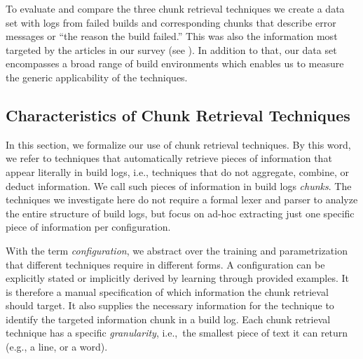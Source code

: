 To evaluate and compare the three chunk retrieval techniques
we create a data set with logs from failed builds and corresponding
chunks that describe error messages or
``the reason the build failed.''
This was also the information
most targeted by the articles in our survey (see ).
In addition to that, our data set encompasses a broad range of
build environments which enables us to measure the generic
applicability of the techniques.


\subsection{Characteristics of Chunk Retrieval Techniques}

\label{sec:crt-characteristics}
In this section, we formalize our use of chunk retrieval techniques. By this word, we refer to techniques that automatically
retrieve pieces of information that appear literally in build
logs, i.e., techniques that do not aggregate, combine, or deduct
information.
We call such pieces of information in build logs
\emph{chunks}.
The techniques we investigate here do not require a formal lexer and
parser to analyze the entire structure of build logs, but focus on
ad-hoc extracting just one specific piece of information per
configuration.

With the term \textit{configuration}, we abstract over the training
and parametrization that different techniques require in different
forms.
A configuration can be explicitly stated or implicitly derived
by learning through provided examples.
It is therefore a manual
specification of which information the chunk retrieval should target.
It also supplies the necessary information for the technique to
identify the targeted information chunk in a build log.
Each chunk
retrieval technique has a specific \textit{granularity}, i.e.,\ the
smallest piece of text it can return (e.g., a line, or a word).

